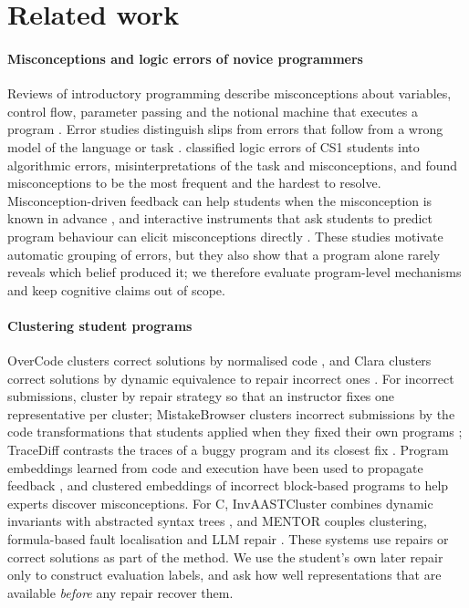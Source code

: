 \section{Related work}\label{sec:related}

\paragraph{Misconceptions and logic errors of novice programmers}
Reviews of introductory programming describe misconceptions about variables, control flow, parameter passing and the notional machine that executes a program \citep{sorva2013notional,qian2017misconceptions}. Error studies distinguish slips from errors that follow from a wrong model of the language or task \citep{altadmri2015compilations,hermans2021brain}. \citet{ettles2018logic} classified logic errors of CS1 students into algorithmic errors, misinterpretations of the task and misconceptions, and found misconceptions to be the most frequent and the hardest to resolve. Misconception-driven feedback can help students when the misconception is known in advance \citep{gusukuma2018misconception}, and interactive instruments that ask students to predict program behaviour can elicit misconceptions directly \citep{lu2024smol}. These studies motivate automatic grouping of errors, but they also show that a program alone rarely reveals which belief produced it; we therefore evaluate program-level mechanisms and keep cognitive claims out of scope.

\paragraph{Clustering student programs}
OverCode clusters correct solutions by normalised code \citep{glassman2015overcode}, and Clara clusters correct solutions by dynamic equivalence to repair incorrect ones \citep{gulwani2018clara}. For incorrect submissions, \citet{kaleeswaran2016semisupervised} cluster by repair strategy so that an instructor fixes one representative per cluster; MistakeBrowser clusters incorrect submissions by the code transformations that students applied when they fixed their own programs \citep{head2017mistakebrowser}; TraceDiff contrasts the traces of a buggy program and its closest fix \citep{suzuki2017tracediff}. Program embeddings learned from code and execution have been used to propagate feedback \citep{piech2015embeddings}, and \citet{shi2021misconception} clustered embeddings of incorrect block-based programs to help experts discover misconceptions. For C, InvAASTCluster combines dynamic invariants with abstracted syntax trees \citep{orvalho2025invaast}, and MENTOR couples clustering, formula-based fault localisation and LLM repair \citep{orvalho2026mentor}. These systems use repairs or correct solutions as part of the method. We use the student's own later repair only to construct evaluation labels, and ask how well representations that are available \emph{before} any repair recover them.

